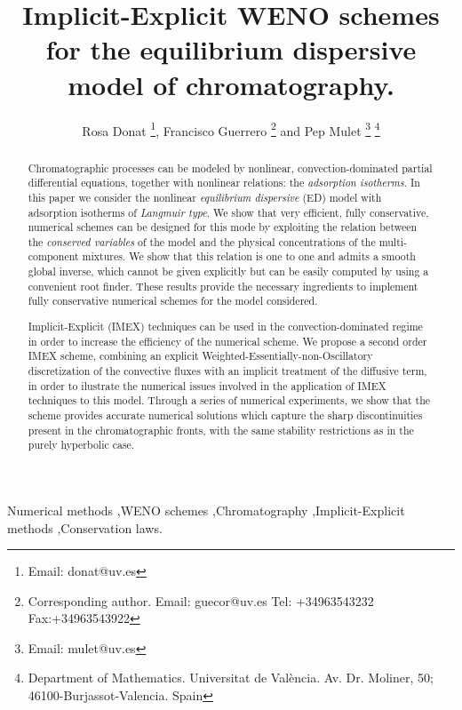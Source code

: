 \documentclass[preprint]{elsarticle}
\theoremstyle{definition}
\begin{document}
 

 
\begin{frontmatter}  





\title{Implicit-Explicit WENO schemes for the equilibrium dispersive model of chromatography.}    
\author{Rosa Donat \footnote{Email: donat@uv.es}, Francisco Guerrero \footnote{Corresponding author. Email: guecor@uv.es Tel: +34963543232 Fax:+34963543922} and Pep Mulet \footnote{Email: mulet@uv.es}%
\thanks{Department of Mathematics. Universitat de Val\`encia. Av. Dr. Moliner, 50; 46100-Burjassot-Valencia. Spain}%
}







\begin{abstract}
Chromatographic processes can be modeled  by nonlinear,
convection-dominated partial differential equations, together with
nonlinear relations: the {\em adsorption isotherms}. In this paper we
consider the nonlinear {\em equilibrium dispersive} (ED) model with
adsorption isotherms of {\em Langmuir type}.  We show that very
efficient, fully conservative,  numerical schemes can be designed for
this mode by exploiting the relation between the {\em conserved
  variables} of the model and the physical concentrations of the
multi-component mixtures. We show that this relation   is one to one
and  
admits a smooth global inverse, which cannot be given explicitly but can be
easily computed by using a convenient root finder. These results
provide the necessary  ingredients to implement  fully conservative
numerical schemes  for the model considered. 

Implicit-Explicit (IMEX) techniques can be used in the convection-dominated
regime in order to increase the efficiency of the numerical scheme.
We propose  a second order IMEX scheme, combining an explicit  
Weighted-Essentially-non-Oscillatory discretization of the convective
fluxes with an implicit treatment of the diffusive term, in order to 
ilustrate  the numerical issues involved in
the application of IMEX techniques to this model. Through a series of numerical experiments, we show
that the  scheme provides
accurate numerical solutions which capture the sharp discontinuities
present in the chromatographic fronts, with the same  stability
restrictions as in the purely hyperbolic case.

 
\end{abstract} 
 
 
  
 
\begin{keyword} 
Numerical methods \sep WENO schemes \sep Chromatography \sep Implicit-Explicit methods \sep Conservation laws. 
 \end{keyword}
 
  
\end{frontmatter} 
\end{document}
